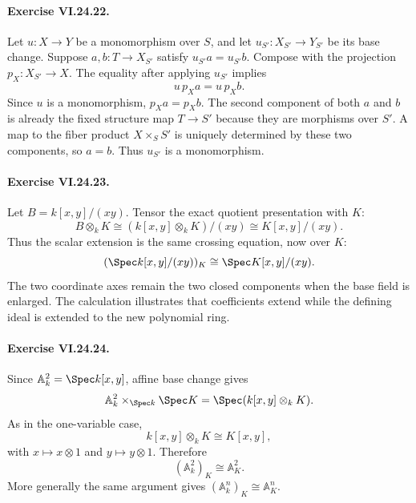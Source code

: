 \paragraph{Exercise VI.24.22.}
\begin{solution}
Let $u:X\to Y$ be a monomorphism over $S$, and let $u_{S'}:X_{S'}\to Y_{S'}$ be its base change.
Suppose $a,b:T\to X_{S'}$ satisfy $u_{S'}a=u_{S'}b$.  Compose with the projection
$p_X:X_{S'}\to X$.  The equality after applying $u_{S'}$ implies
\[
u\,p_Xa=u\,p_Xb.
\]
Since $u$ is a monomorphism, $p_Xa=p_Xb$.  The second component of both $a$ and $b$ is already the
fixed structure map $T\to S'$ because they are morphisms over $S'$.  A map to the fiber product
$X\times_SS'$ is uniquely determined by these two components, so $a=b$.  Thus $u_{S'}$ is a
monomorphism.
\end{solution}

\paragraph{Exercise VI.24.23.}
\begin{solution}
Let $B=k[x,y]/(xy)$.  Tensor the exact quotient presentation with $K$:
\[
B\otimes_kK
\cong (k[x,y]\otimes_kK)/(xy)
\cong K[x,y]/(xy).
\]
Thus the scalar extension is the same crossing equation, now over $K$:
\[
(\Spec k[x,y]/(xy))_K\cong\Spec K[x,y]/(xy).
\]
The two coordinate axes remain the two closed components when the base field is enlarged.  The
calculation illustrates that coefficients extend while the defining ideal is extended to the new
polynomial ring.
\end{solution}

\paragraph{Exercise VI.24.24.}
\begin{solution}
Since $\mathbb A^2_k=\Spec k[x,y]$, affine base change gives
\[
\mathbb A^2_k\times_{\Spec k}\Spec K
=\Spec(k[x,y]\otimes_kK).
\]
As in the one-variable case,
\[
k[x,y]\otimes_kK\cong K[x,y],
\]
with $x\mapsto x\otimes1$ and $y\mapsto y\otimes1$.  Therefore
\[
(\mathbb A^2_k)_K\cong\mathbb A^2_K.
\]
More generally the same argument gives $(\mathbb A^n_k)_K\cong\mathbb A^n_K$.
\end{solution}

